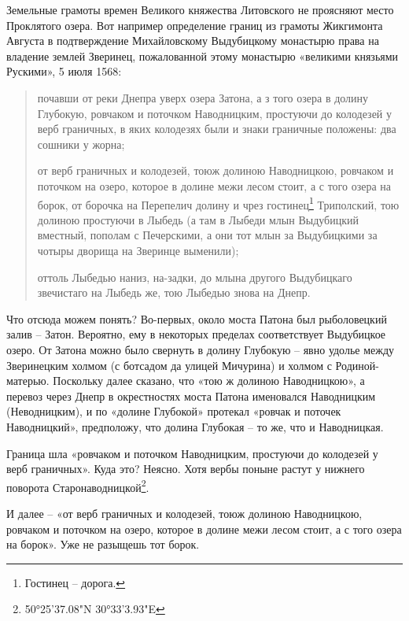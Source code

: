 Земельные грамоты времен Великого княжества Литовского не проясняют место Проклятого озера. Вот например определение границ из грамоты Жикгимонта Августа в подтверждение Михайловскому Выдубицкому монастырю права на владение землей Зверинец, пожалованной этому монастырю «великими князьями Рускими», 5 июля 1568:

\begin{quotation}
почавши от реки Днепра уверх озера Затона, а з того озера в долину Глубокую, ровчаком и поточком Наводницким, простуючи до колодезей у верб граничных, в яких колодезях были и знаки граничные положены: два сошники у жорна; 

от верб граничных и колодезей, тоюж долиною Наводницкою, ровчаком и поточком на озеро, которое в долине межи лесом стоит, а с того озера на борок, от борочка на Перепелич долину и чрез гостинец\footnote{Гостинец – дорога.} Триполский, тою долиною простуючи в Лыбедь (а там в Лыбеди млын Выдубицкий вместный, пополам с Печерскими, а они тот млын за Выдубицкими за чотыры дворища на Зверинце выменили);

оттоль Лыбедью наниз, на-задки, до млына другого Выдубицкаго звечистаго на Лыбедь же, тою Лыбедью знова на Днепр.
\end{quotation}

Что отсюда можем понять? Во-первых, около моста Патона был рыболовецкий залив – Затон. Вероятно, ему в некоторых пределах соответствует Выдубицкое озеро. От Затона можно было свернуть в долину Глубокую – явно удолье между Зверинецким холмом (с ботсадом да улицей Мичурина) и холмом с Родиной-матерью. Поскольку далее сказано, что «тою ж долиною Наводницкою», а перевоз через Днепр в окрестностях моста Патона именовался Наводницким (Неводницким), и по «долине Глубокой» протекал «ровчак и поточек Наводницкий», предположу, что долина Глубокая – то же, что и Наводницкая.

Граница шла «ровчаком и поточком Наводницким, простуючи до колодезей у верб граничных». Куда это? Неясно. Хотя вербы поныне растут у нижнего поворота Старонаводницкой\footnote{50°25'37.08"N 30°33'3.93"E}.

И далее – «от верб граничных и колодезей, тоюж долиною Наводницкою, ровчаком и поточком на озеро, которое в долине межи лесом стоит, а с того озера на борок». Уже не разыщешь тот борок.


